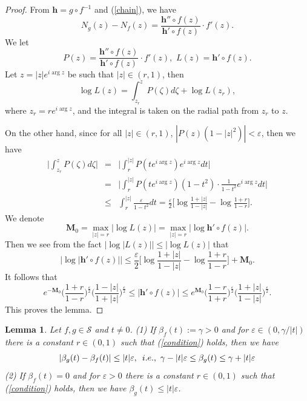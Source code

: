 \documentclass[11pt]{amsart}
\newtheorem{lemma}[theorem]{Lemma}
\theoremstyle{remark}
\theoremstyle{claim}
\theoremstyle{definition}
\theoremstyle{problem}
\theoremstyle{conjecture}
\theoremstyle{question}
\numberwithin{equation}{section}
\begin{document}
\begin{proof}
From $\mathbf{h}=g \circ f^{-1}$ and (\ref{chain}), we have
 \begin{equation}
N_g(z)-N_f(z)=\frac{{\mathbf{h}}'' \circ f(z) }{{\mathbf{h}}' \circ f(z)} \cdot f'(z).\nonumber
\end{equation}
We let $$P(z)=\frac{{\mathbf{h}}'' \circ f(z)}{{\mathbf{h}}' \circ f(z)} \cdot f'(z),\,\, L(z)={\mathbf{h}}' \circ f(z).$$
Let $z=|z|e^{i \arg z}$ be such that $|z|\in (r,1)$, then
\begin{equation}
\log L(z)=\int_{z_r}^z P(\zeta)d\zeta+ \log L(z_r), \nonumber
\end{equation}
where $z_r=r e^{i \arg z}$, and the integral is taken on the radial path from $z_r$ to $z$. 

On the other hand, since for all $|z| \in (r, 1)$,  $|P(z)(1-|z|^2)| <\varepsilon$, then we have
\begin{eqnarray}
\Big| \int_{z_r}^z P(\zeta)d\zeta\Big| &=& \Big| \int_{r}^{|z|} P(t e^{i \arg z}) e^{i \arg z}dt \Big| \nonumber \\
 &= & \Big| \int_{r}^{|z|} P(t e^{i \arg z})(1-t^2) \cdot\frac{1}{1-t^2} e^{i \arg z}dt \Big| \nonumber  \\
 &\leq & \int_{r}^{|z|} \frac{\varepsilon}{1-t^2}dt =\frac{\varepsilon}{2}\Big[\log \frac{1+|z|}{1-|z|}-\log \frac{1+r}{1-r}\Big]. \nonumber \end{eqnarray}
We denote
$$\mathbf{M}_0=\max\limits_{|z|=r}| \log  L(z)|=\max\limits_{|z|=r} |\log{\mathbf{h}}' \circ f(z)|.$$Then we  see from the fact $\Big|\log |L(z)|\Big|\leq |\log L(z)|$ that
\begin{equation}
\Big|\log |{\mathbf{h}}' \circ f(z)|\Big| \leq \frac{\varepsilon}{2}\Big[\log \frac{1+|z|}{1-|z|}-\log \frac{1+r}{1-r}\Big]+\mathbf{M}_0. \nonumber
\end{equation}
It follows that
\begin{equation}
e^{-\mathbf{M}_0}\Big( \frac{1+r}{1-r}\Big)^{\frac{\varepsilon}{2}} \Big( \frac{1-|z|}{1+|z|}\Big)^{\frac{\varepsilon}{2}}\leq |{\mathbf{h}}' \circ f(z)| \leq  e^{\mathbf{M}_0}\Big( \frac{1-r}{1+r}\Big)^{\frac{\varepsilon}{2}} \Big( \frac{1+|z|}{1-|z|}\Big)^{\frac{\varepsilon}{2}}. \nonumber
\end{equation}
This proves the lemma.
\end{proof}

\begin{lemma}\label{key-lemma}
Let $f, g \in \mathcal{S}$ and $t\neq 0$. (1) If $\beta_f(t):=\gamma>0$ and for $\varepsilon\in (0, \gamma/|t|)$ there is a constant $r\in (0, 1) $ such that (\ref{condition}) holds, then we have
\begin{equation}
|\beta_g(t)-\beta_f(t)|\leq |t|\varepsilon,\,\,\, {\textup i.e.,}\,\,\, \gamma-|t|\varepsilon \leq \beta_g(t)\leq \gamma+|t|\varepsilon
\end{equation}
(2) If $\beta_f(t)=0$ and for $\varepsilon>0$ there is a constant $r\in (0,1)$ such that (\ref{condition}) holds, then we have $\beta_g(t)\leq |t|\varepsilon$.
\end{lemma}
\end{document}
